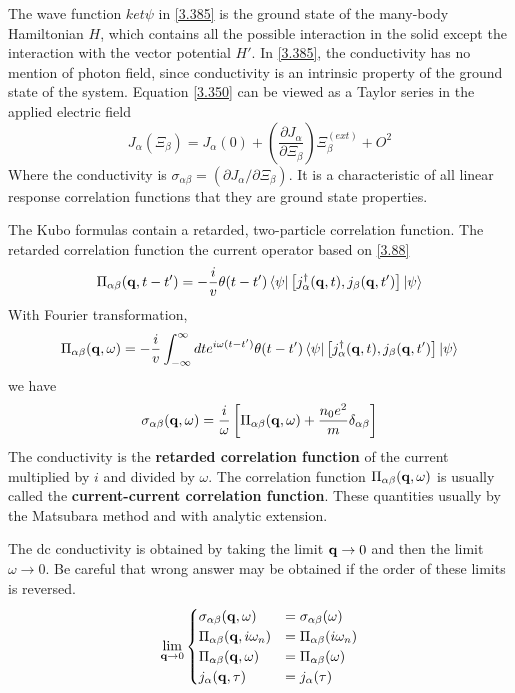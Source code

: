 The wave function $ket{\psi}$ in \eqref{3.385} is the ground state of the many-body Hamiltonian $H$, which contains all the possible interaction in the solid except the interaction with the vector potential $H'$.
In \eqref{3.385}, the conductivity has no mention of photon field, since conductivity is an intrinsic property of the ground state of the system.
Equation \eqref{3.350} can be viewed as a Taylor series in the applied electric field
\begin{equation}
    J_\alpha(\Xi_\beta) = J_\alpha(0) + \left( \frac{\partial J_\alpha}{\partial \Xi_\beta} \right) \Xi_\beta^{(ext)} + O^2 \label{3.386}
\end{equation}
Where the conductivity is $\sigma_{\alpha\beta} = (\partial J_\alpha /\partial \Xi_\beta)$.
It is a characteristic of all linear response correlation functions that they are ground state properties.

The Kubo formulas contain a retarded, two-particle correlation function.
The retarded correlation function the current operator based on \eqref{3.88}
\begin{equation}
    \Pi_{\alpha\beta}(\mathbf{q},t-t') = - \frac{i}{v} \theta(t-t') \bra{\psi} \left[j^\dagger_\alpha(\mathbf{q},t),j_\beta(\mathbf{q},t') \right] \ket{\psi}    \label{3.387}
\end{equation}
With Fourier transformation,
\begin{equation}
    \Pi_{\alpha\beta}(\mathbf{q},\omega) = - \frac{i}{v} \int_{-\infty}^\infty dt e^{i\omega(t-t')} \theta(t-t') \bra{\psi} \left[j^\dagger_\alpha(\mathbf{q},t),j_\beta(\mathbf{q},t') \right] \ket{\psi}
\end{equation}
we have
\begin{equation}
    \sigma_{\alpha\beta}(\mathbf{q},\omega) = \frac{i}{\omega} \left[\Pi_{\alpha\beta}(\mathbf{q},\omega) + \frac{n_0e^2}{m} \delta_{\alpha\beta} \right] \label{3.388}
\end{equation}
The conductivity is the \textbf{retarded correlation function} of the current multiplied by $i$ and divided by $\omega$.
The correlation function $\Pi_{\alpha\beta}(\mathbf{q},\omega)$ is usually called the \textbf{current-current correlation function}.
These quantities usually by the Matsubara method and with analytic extension.

The dc conductivity is obtained by taking the limit $\mathbf{q} \to 0$ and then the limit $\omega \to 0$.
Be careful that wrong answer may be obtained if the order of these limits is reversed.
\begin{equation}
    \lim_{\mathbf{q} \to 0}
    \begin{cases}
        \sigma_{\alpha\beta}(\mathbf{q},\omega) &= \sigma_{\alpha\beta}(\omega) \\
        \Pi_{\alpha\beta}(\mathbf{q},i\omega_n) &= \Pi_{\alpha\beta}(i\omega_n) \\
        \Pi_{\alpha\beta}(\mathbf{q},\omega) &= \Pi_{\alpha\beta}(\omega)\\
        j_\alpha(\mathbf{q},\tau) &=j_\alpha(\tau)
    \end{cases}
    \label{3.392}
\end{equation}

